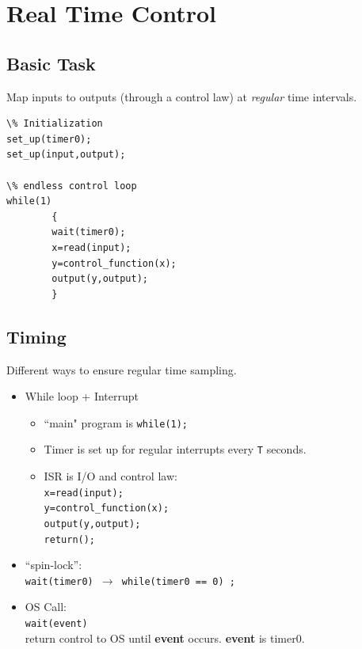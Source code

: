 \documentclass{article}	%
\begin{document}
\section{Real Time Control }

\subsection{Basic Task}
Map inputs to outputs (through a control law) at
{\it regular } time intervals.



\begin{verbatim}
\% Initialization
set_up(timer0);
set_up(input,output);

\% endless control loop
while(1)
        {
        wait(timer0);
        x=read(input);
        y=control_function(x);
        output(y,output);
        }
\end{verbatim}


\subsection{Timing}
Different ways to ensure regular time sampling.


\begin{itemize}
        \item While loop + Interrupt
        \begin{itemize}
                \item ``main" program is {\tt while(1);}
                \item Timer is set up for regular interrupts
                every {\tt T} seconds.
                \item ISR is I/O and control law: \\
                {\tt x=read(input); \\
                y=control\_function(x);  \\
                output(y,output); \\
                return();}
        \end{itemize}


        \item  ``spin-lock'': \\
         {\tt wait(timer0) $\to$ while(timer0 == 0) ;}
        \item  OS Call:   \\
        {\tt wait(event)} \\
        return control to OS until {\bf event} occurs.  {\bf event} is timer0.
\end{itemize}
\end{document}
